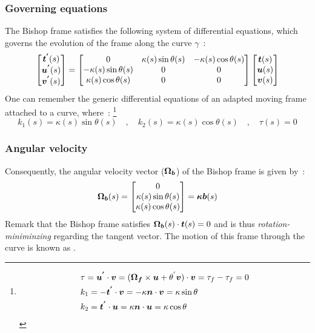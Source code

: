 \subsubsection{Governing equations}
The Bishop frame satisfies the following system of differential equations, which governs the evolution of the frame along the curve $\gamma$~:
\begin{equation}
	\begin{bmatrix}
		\boldsymbol{t^{'}}(s) \\
		\boldsymbol{u^{'}}(s) \\
		\boldsymbol{v^{'}}(s)
	\end{bmatrix}
	=
	\begin{bmatrix}
		0 & \kappa(s) \sin \theta(s) & -\kappa(s) \cos \theta(s) \\
		-\kappa(s) \sin \theta(s) & 0 & 0 \\
		\kappa(s) \cos \theta(s) & 0 & 0
	\end{bmatrix}
	\begin{bmatrix}
		\boldsymbol{t}(s) \\
		\boldsymbol{u}(s) \\
		\boldsymbol{v}(s)
	\end{bmatrix}
\label{eq:3_12}
\end{equation}
One can remember the generic differential equations of an adapted moving frame attached to a curve, where~: \footnote{
\begin{equation*}
	\begin{aligned}
		&\tau =\boldsymbol{u^{'}} \cdot \boldsymbol{v} = (\boldsymbol{\Omega_f} \times \boldsymbol{u} + \theta^{'} \boldsymbol{v})\cdot  \boldsymbol{v} = \tau_f - \tau_f = 0\\
		&k_1 = -\boldsymbol{t^{'}} \cdot \boldsymbol{v} = -\kappa \boldsymbol{n} \cdot \boldsymbol{v} = \kappa \sin \theta \\
		&k_2 = \boldsymbol{t^{'}} \cdot \boldsymbol{u} = \kappa \boldsymbol{n} \cdot \boldsymbol{u} = \kappa \cos \theta
	\end{aligned}
\end{equation*}
}
\begin{equation}
k_{1}(s) = \kappa(s) \sin \theta(s)
\quad,\quad
k_{2}(s) = \kappa(s) \cos \theta(s)
\quad,\quad
\tau(s) = 0
\end{equation}

\subsubsection{Angular velocity}\label{sec:bishopvelocity}
Consequently, the angular velocity vector ($\boldsymbol{\Omega_{b}}$) of the Bishop frame is given by~:
\begin{equation}
	\boldsymbol{\Omega_b}(s) 
	=
	\begin{bmatrix}
		0\\
		\kappa(s) \sin \theta(s)\\
		\kappa(s) \cos \theta(s)
	\end{bmatrix}
	= \boldsymbol{\kappa b}(s) 
\end{equation}
Remark that the Bishop frame satisfies $\boldsymbol{\Omega_b}(s) \cdot \boldsymbol{t}(s) = 0$ and is thus \emph{rotation-miniminzing} regarding the tangent vector. The motion of this frame through the curve is known as .

